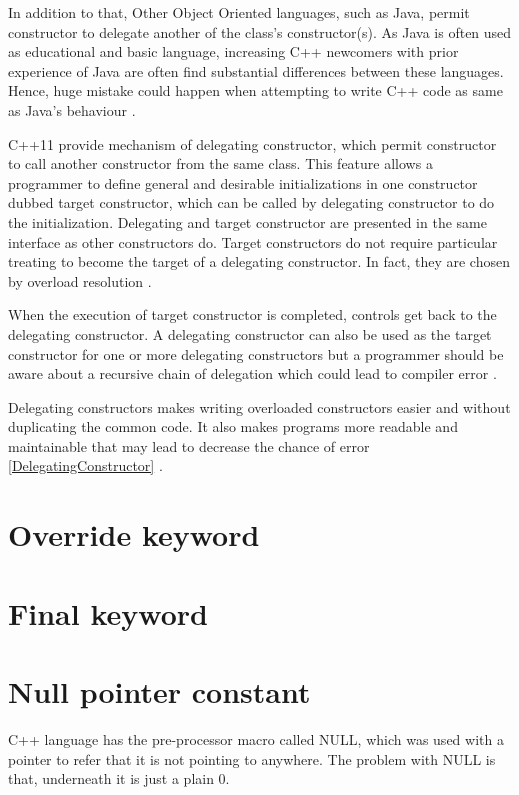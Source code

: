 \documentclass[11pt]{report}
\begin{document}
In addition to that, Other Object Oriented languages, such as Java, permit constructor to delegate another of the class's constructor(s).  As Java is often used as educational and basic language, increasing C++ newcomers with prior experience of Java are often find substantial differences between these languages. Hence, huge mistake could happen when attempting to write C++ code as same as Java's behaviour \cite{Overland:2011:CWF}.
\newline

C++11 provide mechanism of delegating constructor, which permit constructor to call another constructor from the same class. This feature allows a programmer to define general and desirable initializations in one constructor dubbed target constructor, which can be called by delegating constructor to do the initialization. Delegating and target constructor are presented in the same interface as other constructors do. Target constructors do not require particular treating to become the target of a delegating constructor. In fact, they are chosen by overload resolution \cite{Overland:2011:CWF}.
\newline

When the execution of target constructor is completed, controls get back to the delegating constructor. A delegating constructor can also be used as the target constructor for one or more delegating constructors but a programmer should be aware about a recursive chain of delegation which could lead to compiler error \cite{Overland:2011:CWF}.
\newline

Delegating constructors makes writing overloaded constructors easier and without duplicating the common code. It also makes programs more readable and maintainable that may lead to decrease the chance of error \ref{DelegatingConstructor} \cite{Overland:2011:CWF}.

\section{Override keyword}
\label{section: Override keyword}

\section{Final keyword}
\label{section: Final keyword}


\section{Null pointer constant}
\label{section: Null pointer constant}
C++ language has the pre-processor macro called NULL, which was used with a pointer to refer that it is not pointing to anywhere. The problem with NULL is that, underneath it is just a plain 0. 
\newline
\end{document}
